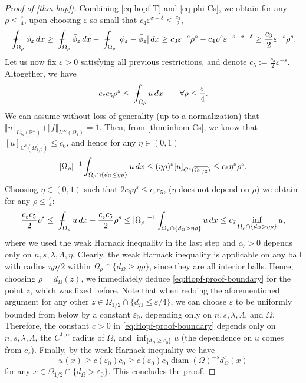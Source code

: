 \documentclass[11pt,reqno]{amsart}
\theoremstyle{plain}
\theoremstyle{definition}
\numberwithin{equation}{section}
\newcommand{\R}{\mathbb{R}}
\newcommand{\eps}{\varepsilon}
\newcommand{\1}{\mathbbm{1}}
\DeclareMathOperator{\diam}{diam}
\renewcommand{\d}{\textnormal{\,d}}
\newcommand{\average}{{\mathchoice {\kern1ex\vcenter{\hrule height.4pt
width 6pt depth0pt} \kern-9.7pt} {\kern1ex\vcenter{\hrule
height.4pt width 4.3pt depth0pt} \kern-7pt} {} {} }}
\newcommand{\dashint}{\average\int}
\begin{document}
\begin{proof}[Proof of \autoref{thm-hopf}]
Combining \eqref{eq-hopf-T} and \eqref{eq-phi-Cs}, we obtain for any $\rho \le \frac{\varepsilon}{4}$, upon choosing $\eps$ so small that $c_4 \eps^{\sigma - \delta} \le \frac{c_3}{2}$,
\begin{align*}
    \dashint_{\Omega_{\rho}} \phi_{\eps} \d x \ge \dashint_{\Omega_{\rho}} \bar{\phi}_{\eps} \d x - \dashint_{\Omega_{\rho}} |\phi_{\eps} - \bar{\phi}_{\eps}| \d x \ge c_3 \eps^{-s} \rho^s - c_4 \rho^s \eps^{-s + \sigma - \delta} \ge \frac{c_3}{2} \eps^{-s}\rho^s. 
\end{align*}
Let us now fix $\eps > 0$ satisfying all previous restrictions, and denote $c_5 := \frac{c_3}{2} \eps^{-s}$. Altogether, we have
\begin{align*}
    c_{\eps} c_5 \rho^s \le \dashint_{\Omega_{\rho}} u \d x \qquad \forall \rho \leq \frac{\eps}{4}.
\end{align*}
We can assume without loss of generality (up to a normalization) that $\Vert u \Vert_{L^1_{2s}(\R^n)} + \Vert f \Vert_{L^{\infty}(\Omega_1)} = 1$. Then, from  \autoref{thm:inhom-Cs}, we know that $[u]_{C^s(\overline{\Omega_{1/2}})} \le c_6$, and hence for any $\eta \in (0,1)$
\begin{align*}
    |\Omega_{\rho}|^{-1} \int_{\Omega_{\rho} \cap \{ d_{\Omega} \le \eta \rho \} } u \d x \le  (\eta \rho) ^s [u]_{C^s(\overline{\Omega_{1/2}})} \le c_6 \eta^s \rho^s.
\end{align*}
Choosing $\eta \in (0,1)$ such that $2 c_6 \eta^s \le c_{\eps} c_5$, ($\eta$ does not depend on $\rho$) we obtain for any $\rho \le \frac{\eps}{4}$:
\begin{align*}
    \frac{c_{\eps} c_5}{2} \rho^s \le \dashint_{\Omega_{\rho}} u \d x  - \frac{c_{\eps} c_5}{2} \rho^s \le |\Omega_{\rho}|^{-1} \int_{\Omega_{\rho} \cap \{ d_{\Omega} > \eta \rho \} } u \d x \le c_7 \inf_{\Omega_{\rho} \cap \{ d_{\Omega} > \eta \rho \} } u,
\end{align*}
where we used the weak Harnack inequality in the last step and $c_7 > 0$ depends only on $n,s,\lambda,\Lambda,\eta$. Clearly, the weak Harnack inequality is applicable on any ball with radius $\eta\rho/2$ within $\Omega_{\rho} \cap \{ d_{\Omega} \ge \eta \rho \}$, since they are all interior balls.
Hence, choosing $\rho = d_{\Omega}(z)$, we immediately deduce \eqref{eq:Hopf-proof-boundary} for the point $z$, which was fixed before.
Note that when redoing the aforementioned argument for any other $z \in \Omega_{1/2} \cap \{ d_{\Omega} \le \eps/4 \}$, we can choose $\eps$ to be uniformly bounded from below by a constant $\eps_0$, depending only on $n,s,\lambda,\Lambda$, and $\Omega$. Therefore, the constant $c > 0$ in \eqref{eq:Hopf-proof-boundary} depends only on $n,s,\lambda,\Lambda$, the $C^{1,\alpha}$ radius of $\Omega$, and $\inf_{\{ d_{\Omega} \ge \eps_0 \} } u$ (the dependence on $u$ comes from $c_{\eps}$).
Finally, by the weak Harnack inequality we have
\begin{equation*}
u(x) \geq c(\varepsilon_0) c_0 \geq c(\varepsilon_0) c_0 \diam(\Omega)^{-s} d_\Omega^s(x)
\end{equation*}
for any $x \in \Omega_{1/2} \cap \{d_{\Omega} > \varepsilon_0 \}$. This concludes the proof.
\end{proof}
\end{document}
